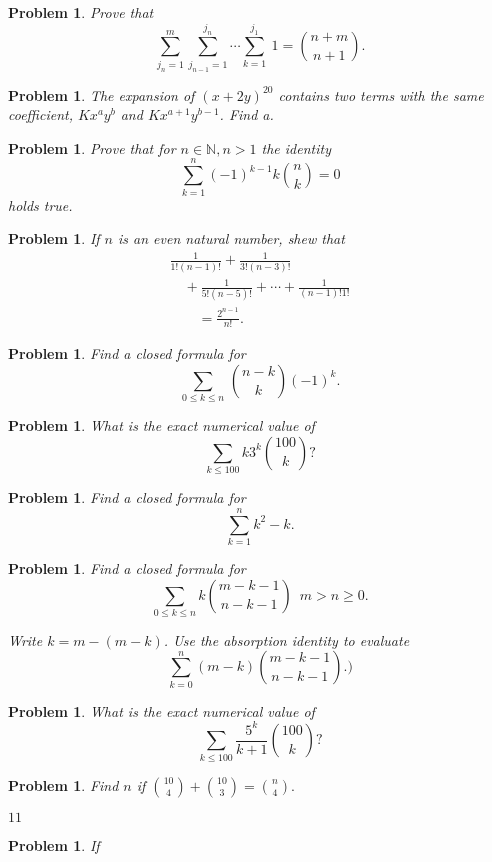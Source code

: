 \documentclass[11pt, openany]{book}
\theoremstyle{change} \theoremheaderfont{\blue\sffamily\bfseries}
\newtheorem{pro}[thm]{Problem}
\theoremstyle{nonumberplain} \theoremheaderfont{\sffamily\bfseries}
\newcommand{\BBN}{\mathbb{N}}
\def\binom#1#2{{#1\choose#2}}
\newcommand{\í}{\'{\i}}
\begin{document}
\begin{multicols}{2}
\begin{pro} Prove that
$$ \sum _{j_n = 1} ^m \sum _{j_{n - 1} = 1} ^{j_n} \cdots \sum _{k = 1} ^{j_{1}} \ 1 = \binom{n + m}{n + 1}.$$\end{pro}
\begin{pro} The expansion of $(x + 2y)^{20}$ contains two terms with
the same coefficient, $Kx^ay^b$ and $Kx^{a + 1}y^{b - 1}$. Find
a.\end{pro}
\begin{pro} Prove that for $n \in \BBN , n > 1$ the identity
$$ \sum _{k = 1} ^n (-1)^{k - 1}k\binom{n}{k} = 0$$holds true.\end{pro}
\begin{pro} If $n$ is an even natural number, shew that
$$\begin{array}{l}
\frac{1}{1!(n - 1)!} + \frac{1}{3!(n - 3)!} \\ \quad + \frac{1}{5!(n
- 5)!} + \cdots + \frac{1}{(n - 1)!1!}\\ \qquad = \frac{2^{n -
1}}{n!}.\end{array}$$\end{pro}
\begin{pro} Find a closed formula for $$\sum _{0 \leq k \leq n} \, \binom{n - k}{k} (-1)^k .$$
\end{pro}
\begin{pro} What is the exact numerical value of $$ \sum _{k \leq 100}k3^k\binom{100}{k}?$$\end{pro}
\begin{pro} Find a closed formula for $$ \sum _{k = 1} ^n k^2 - k.$$ \end{pro}
\begin{pro} Find a closed formula for
$$ \sum _{0 \leq k \leq n} k \binom{m - k - 1}{n - k - 1}\,\,\, m > n
\geq 0.$$
\begin{answer}
Write $k = m - (m - k)$. Use the absorption identity to evaluate
$$ \sum _{k = 0} ^n (m - k)\binom{m - k - 1}{n - k - 1}.)$$
\end{answer}
\end{pro}
\begin{pro} What is the exact numerical value of
$$ \sum _{k \leq 100} \frac{5^k}{k + 1}\binom{100}{k}?$$\end{pro}
\begin{pro} Find $n$ if $\binom{10}{4} + \binom{10}{3} = \binom{n}{4}.$
\begin{answer} $11$ \end{answer}
\end{pro}
\begin{pro} If

\end{pro}
\end{multicols}
\end{document}
